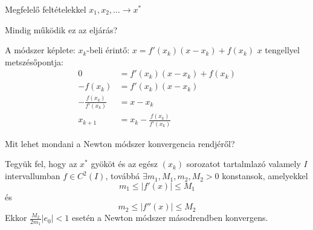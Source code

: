 Megfelelő feltételekkel $x_{1}, x_{2}, \dots \to x^{*}$

\begin{kerdes}
    Mindig működik ez az eljárás?
\end{kerdes}

A módszer képlete:
$x_{k}$-beli érintő: $x = f'(x_{k})(x - x_{k}) + f(x_{k})$
$x$ tengellyel metszésőpontja:
\begin{align*}
    0 & = f'(x_{k})(x - x_{k}) + f(x_{k}) \\
    -f(x_{k}) & = f'(x_{k})(x - x_{k}) \\
    -\frac{f(x_{k})}{f'(x_{k})} & = x - x_{k} \\
    x_{k+1} & = x_{k} - \frac{f(x_{k})}{f'(x_{k})}
\end{align*}
\begin{kerdes}
    Mit lehet mondani a Newton módszer konvergencia rendjéről?
\end{kerdes}

\begin{allitas}
    Tegyük fel, hogy az $x^{*}$ gyököt és az egész $(x_{k})$ sorozatot tartalmlazó valamely $I$  intervallumban $f \in C^{2}(I)$, továbbá $\exists m_{1},M_{1}, m_{2}, M_{2} > 0$ konstansok, amelyekkel 
    \begin{equation*}
        m_{1} \leq \lvert f'(x) \rvert  \leq M_{1}
    \end{equation*}
    és
    \begin{equation*}
        m_{2} \leq \lvert f''(x) \rvert  \leq M_{2}
    \end{equation*}
    Ekkor $\frac{M_{2}}{2m_{1}}\lvert e_{0} \rvert < 1$ esetén a Newton módszer másodrendben konvergens.
\end{allitas}

